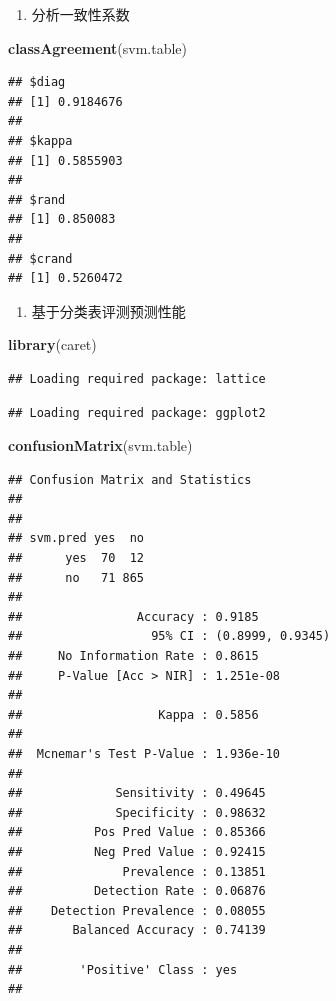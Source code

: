 \documentclass[
]{article}
\newenvironment{Shaded}{\begin{snugshade}}{\end{snugshade}}
\newcommand{\KeywordTok}[1]{\textcolor[rgb]{0.13,0.29,0.53}{\textbf{#1}}}
\newcommand{\NormalTok}[1]{#1}
\providecommand{\tightlist}{%
  \setlength{\itemsep}{0pt}\setlength{\parskip}{0pt}}
\begin{document}
\begin{enumerate}
\def\labelenumi{\arabic{enumi}.}
\setcounter{enumi}{2}
\tightlist
\item
  分析一致性系数
\end{enumerate}

\begin{Shaded}
\begin{Highlighting}[]
\KeywordTok{classAgreement}\NormalTok{(svm.table)}
\end{Highlighting}
\end{Shaded}

\begin{verbatim}
## $diag
## [1] 0.9184676
## 
## $kappa
## [1] 0.5855903
## 
## $rand
## [1] 0.850083
## 
## $crand
## [1] 0.5260472
\end{verbatim}

\begin{enumerate}
\def\labelenumi{\arabic{enumi}.}
\setcounter{enumi}{3}
\tightlist
\item
  基于分类表评测预测性能
\end{enumerate}

\begin{Shaded}
\begin{Highlighting}[]
\KeywordTok{library}\NormalTok{(caret)}
\end{Highlighting}
\end{Shaded}

\begin{verbatim}
## Loading required package: lattice
\end{verbatim}

\begin{verbatim}
## Loading required package: ggplot2
\end{verbatim}

\begin{Shaded}
\begin{Highlighting}[]
\KeywordTok{confusionMatrix}\NormalTok{(svm.table)}
\end{Highlighting}
\end{Shaded}

\begin{verbatim}
## Confusion Matrix and Statistics
## 
##         
## svm.pred yes  no
##      yes  70  12
##      no   71 865
##                                           
##                Accuracy : 0.9185          
##                  95% CI : (0.8999, 0.9345)
##     No Information Rate : 0.8615          
##     P-Value [Acc > NIR] : 1.251e-08       
##                                           
##                   Kappa : 0.5856          
##                                           
##  Mcnemar's Test P-Value : 1.936e-10       
##                                           
##             Sensitivity : 0.49645         
##             Specificity : 0.98632         
##          Pos Pred Value : 0.85366         
##          Neg Pred Value : 0.92415         
##              Prevalence : 0.13851         
##          Detection Rate : 0.06876         
##    Detection Prevalence : 0.08055         
##       Balanced Accuracy : 0.74139         
##                                           
##        'Positive' Class : yes             
## 
\end{verbatim}
\end{document}
